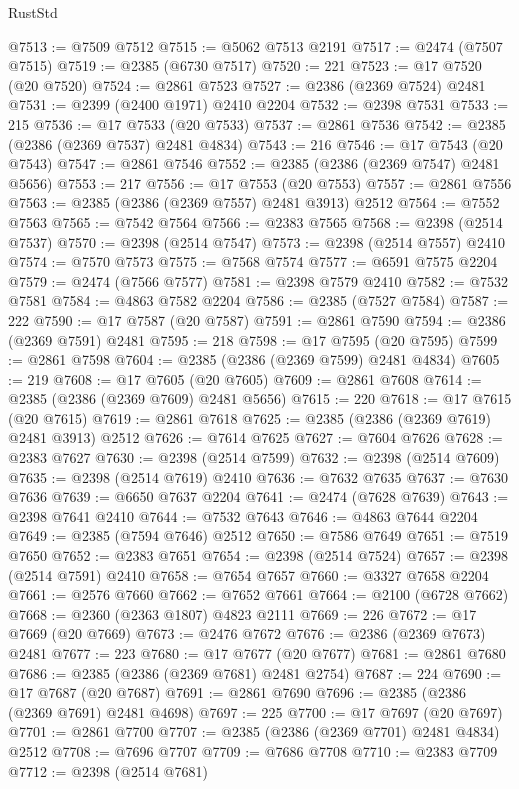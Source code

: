 \begin{lexlean}{RustStd}
\begin{coremodule}
{\begin{coremodule}
{{{{{{{{{{{{{{{{{{{{{{{{{{{{{{{{{{{{{{{{{{{{{{{{{{@7513 := @7509 @7512
@7515 := @5062 @7513 @2191
@7517 := @2474 (@7507 @7515)
@7519 := @2385 (@6730 @7517)
@7520 := 221
@7523 := @17 @7520 (@20 @7520)
@7524 := @2861 @7523
@7527 := @2386 (@2369 @7524) @2481
@7531 := @2399 (@2400 @1971) @2410 @2204
@7532 := @2398 @7531
@7533 := 215
@7536 := @17 @7533 (@20 @7533)
@7537 := @2861 @7536
@7542 := @2385 (@2386 (@2369 @7537) @2481 @4834)
@7543 := 216
@7546 := @17 @7543 (@20 @7543)
@7547 := @2861 @7546
@7552 := @2385 (@2386 (@2369 @7547) @2481 @5656)
@7553 := 217
@7556 := @17 @7553 (@20 @7553)
@7557 := @2861 @7556
@7563 := @2385 (@2386 (@2369 @7557) @2481 @3913) @2512
@7564 := @7552 @7563
@7565 := @7542 @7564
@7566 := @2383 @7565
@7568 := @2398 (@2514 @7537)
@7570 := @2398 (@2514 @7547)
@7573 := @2398 (@2514 @7557) @2410
@7574 := @7570 @7573
@7575 := @7568 @7574
@7577 := @6591 @7575 @2204
@7579 := @2474 (@7566 @7577)
@7581 := @2398 @7579 @2410
@7582 := @7532 @7581
@7584 := @4863 @7582 @2204
@7586 := @2385 (@7527 @7584)
@7587 := 222
@7590 := @17 @7587 (@20 @7587)
@7591 := @2861 @7590
@7594 := @2386 (@2369 @7591) @2481
@7595 := 218
@7598 := @17 @7595 (@20 @7595)
@7599 := @2861 @7598
@7604 := @2385 (@2386 (@2369 @7599) @2481 @4834)
@7605 := 219
@7608 := @17 @7605 (@20 @7605)
@7609 := @2861 @7608
@7614 := @2385 (@2386 (@2369 @7609) @2481 @5656)
@7615 := 220
@7618 := @17 @7615 (@20 @7615)
@7619 := @2861 @7618
@7625 := @2385 (@2386 (@2369 @7619) @2481 @3913) @2512
@7626 := @7614 @7625
@7627 := @7604 @7626
@7628 := @2383 @7627
@7630 := @2398 (@2514 @7599)
@7632 := @2398 (@2514 @7609)
@7635 := @2398 (@2514 @7619) @2410
@7636 := @7632 @7635
@7637 := @7630 @7636
@7639 := @6650 @7637 @2204
@7641 := @2474 (@7628 @7639)
@7643 := @2398 @7641 @2410
@7644 := @7532 @7643
@7646 := @4863 @7644 @2204
@7649 := @2385 (@7594 @7646) @2512
@7650 := @7586 @7649
@7651 := @7519 @7650
@7652 := @2383 @7651
@7654 := @2398 (@2514 @7524)
@7657 := @2398 (@2514 @7591) @2410
@7658 := @7654 @7657
@7660 := @3327 @7658 @2204
@7661 := @2576 @7660
@7662 := @7652 @7661
@7664 := @2100 (@6728 @7662)
@7668 := @2360 (@2363 @1807) @4823 @2111
@7669 := 226
@7672 := @17 @7669 (@20 @7669)
@7673 := @2476 @7672
@7676 := @2386 (@2369 @7673) @2481
@7677 := 223
@7680 := @17 @7677 (@20 @7677)
@7681 := @2861 @7680
@7686 := @2385 (@2386 (@2369 @7681) @2481 @2754)
@7687 := 224
@7690 := @17 @7687 (@20 @7687)
@7691 := @2861 @7690
@7696 := @2385 (@2386 (@2369 @7691) @2481 @4698)
@7697 := 225
@7700 := @17 @7697 (@20 @7697)
@7701 := @2861 @7700
@7707 := @2385 (@2386 (@2369 @7701) @2481 @4834) @2512
@7708 := @7696 @7707
@7709 := @7686 @7708
@7710 := @2383 @7709
@7712 := @2398 (@2514 @7681)
}}}}}}}}}}}}}}}}}}}}}}}}}}}}}}}}}}}}}}}}}}}}}}}}}}
\end{coremodule}}
\end{coremodule}
\end{lexlean}
